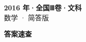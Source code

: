 \documentclass[zihao=-4, a4paper]{ctexart}
\begin{document}
\begin{center}
  {\Large\bfseries 2016 年·全国Ⅲ卷·文科}\\[4pt]
  {\large 数学 · 简答版}
\end{center}
\medskip
{}

\clearpage
{}
\begin{center}{\Large\bfseries 答案速查}\end{center}
\medskip

\end{document}
